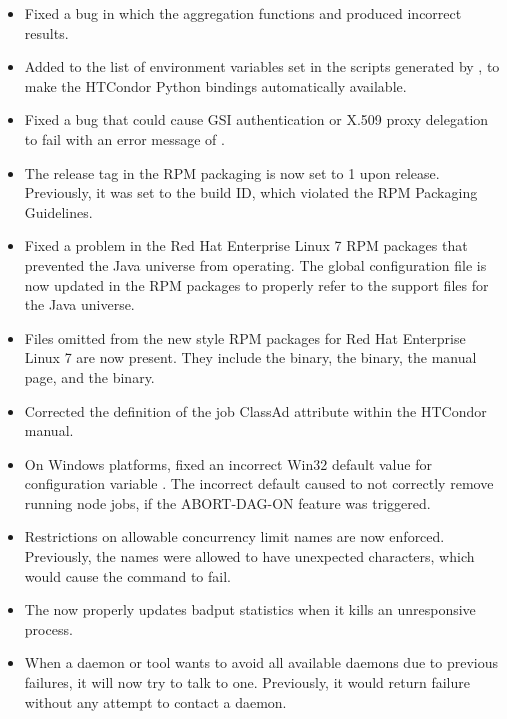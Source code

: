 \begin{itemize}
\item Fixed a bug in which the  aggregation functions 
 and  produced incorrect results.

\item Added  to the list of environment variables set in the
scripts generated by , to make the HTCondor Python
bindings automatically available.

\item Fixed a bug that could cause GSI authentication or X.509 proxy
delegation to fail with an error message of
.

\item 
The release tag in the RPM packaging is now set to 1 upon release.
Previously, it was set to the build ID, which violated the RPM Packaging
Guidelines.

\item Fixed a problem in the Red Hat Enterprise Linux 7 RPM packages
that prevented the Java universe from operating.
The global configuration file is now updated in the RPM packages
to properly refer to the support files for the Java universe.

\item Files omitted from the new style RPM packages 
for Red Hat Enterprise Linux 7 are now present.
They include
the  binary, the  binary,
the  manual page, 
and the  binary.

\item Corrected the definition of the job ClassAd attribute 
 within the HTCondor manual.

\item On Windows platforms, fixed an incorrect Win32 default value for
configuration variable .
The incorrect default caused 
to not correctly remove running node jobs,
if the ABORT-DAG-ON feature was triggered.

\item Restrictions on allowable concurrency limit names are now enforced.
Previously, the names were allowed to have unexpected characters, which
would cause the  command to fail.

\item The  now properly updates badput statistics when
it kills an unresponsive  process.

\item When a daemon or tool wants to avoid all available 
 daemons due to previous failures, 
it will now try to talk to one.
Previously, it would return failure without any attempt to contact a
 daemon.

\end{itemize}

